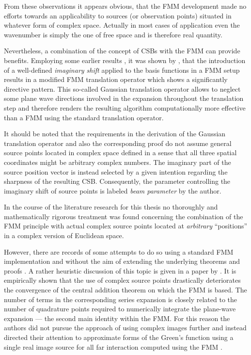 From these observations it appears obvious, that the \ac{FMM} development
made no efforts towards an applicability to sources (or observation points)
situated in whatever form of complex space.
Actually in most cases of application even the wavenumber is simply the one of
free space and is therefore real quantity.

Nevertheless, a combination of the concept of \acp{CSB} with the \ac{FMM} can
provide benefits.
Employing some earlier results \cite{Hansen2009}, it was shown by
\textcite{Hansen2013}, that the introduction of a well-defined
\emph{imaginary shift} applied to the basis functions in a \ac{FMM} setup
results in a modified \ac{FMM} translation operator which shows a significantly
directive pattern.
This so-called Gaussian translation operator allows to neglect some plane wave
directions involved in the expansion throughout the translation step
and therefore renders the resulting algorithm computationally more effective
than a \ac{FMM} using the standard translation operator.

It should be noted that the requirements in the derivation of the Gaussian
translation operator and also the corresponding proof 
\cite[Appendix]{Hansen2013} do not assume general source points located in
complex space defined in a sense that all three spatial coordinates might
be arbitrary complex numbers.
The imaginary part of the source position vector is instead selected by a given
intention regarding the sharpness of the resulting \ac{CSB}.
Consequently, the parameter controlling the imaginary shift of source points
is labeled \emph{beam parameter} by the author.


In the course of the literature research for this thesis no thoroughly and 
mathematically rigorous treatment was found concerning the combination
of the \ac{FMM} principle with actual complex source points located at
\emph{arbitrary} \enquote{positions} in a complex version of Euclidean space.

However, there are records of some attempts to do so using a standard \ac{FMM}
implementation and without the aim of extending the underlying theorems and
proofs \cite{Rokhlin1993}.
A rather heuristic discussion of this topic is given in a paper by
\textcite{Geng2001}.
It is empirically shown that the use of complex source points drastically
deteriorates the convergence of the central addition theorem on which the
\ac{FMM} is based.
The number of terms in the corresponding series expansion is closely
related to the number of quadrature points required to numerically integrate
the plane-wave expansion --- the second main identity within the
\ac{FMM}.
For this reason the authors did not pursue the approach of using complex images
further and instead directed their attention to approximate forms of the
Green's function using a single real image source for all far interaction
computed using the \ac{FMM} \cite{Geng1999, Geng2000}.

